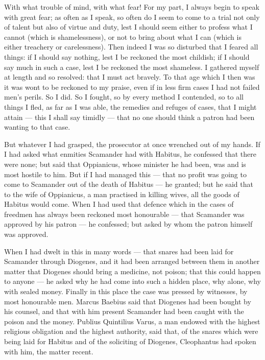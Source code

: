  With what trouble of mind, with what fear! For my part, I always begin to speak with great fear; as often as I speak, so often do I seem to come to a trial not only of talent but also of virtue and duty, lest I should seem either to profess what I cannot (which is shamelessness), or not to bring about what I can (which is either treachery or carelessness). Then indeed I was so disturbed that I feared all things: if I should say nothing, lest I be reckoned the most childish; if I should say much in such a case, lest I be reckoned the most shameless. I gathered myself at length and so resolved: that I must act bravely. To that age which I then was it was wont to be reckoned to my praise, even if in less firm cases I had not failed men's perils. So I did. So I fought, so by every method I contended, so to all things I fled, as far as I was able, the remedies and refuges of cases, that I might attain --- this I shall say timidly --- that no one should think a patron had been wanting to that case.

 But whatever I had grasped, the prosecutor at once wrenched out of my hands. If I had asked what enmities Scamander had with Habitus, he confessed that there were none; but said that Oppianicus, whose minister he had been, was and is most hostile to him. But if I had managed this --- that no profit was going to come to Scamander out of the death of Habitus --- he granted; but he said that to the wife of Oppianicus, a man practised in killing wives, all the goods of Habitus would come. When I had used that defence which in the cases of freedmen has always been reckoned most honourable --- that Scamander was approved by his patron --- he confessed; but asked by whom the patron himself was approved.

 When I had dwelt in this in many words --- that snares had been laid for Scamander through Diogenes, and it had been arranged between them in another matter that Diogenes should bring a medicine, not poison; that this could happen to anyone --- he asked why he had come into such a hidden place, why alone, why with sealed money. Finally in this place the case was pressed by witnesses, by most honourable men. Marcus Baebius said that Diogenes had been bought by his counsel, and that with him present Scamander had been caught with the poison and the money. Publius Quintilius Varus, a man endowed with the highest religious obligation and the highest authority, said that, of the snares which were being laid for Habitus and of the soliciting of Diogenes, Cleophantus had spoken with him, the matter recent.


